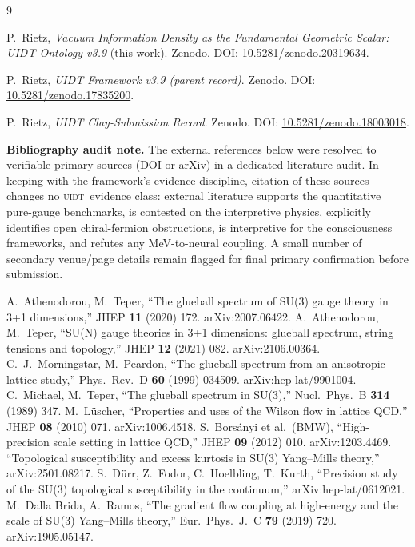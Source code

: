 \documentclass[12pt,a4paper,twoside]{article}
\theoremstyle{plain}
\theoremstyle{definition}
\theoremstyle{remark}
\newcommand{\UIDT}{\textsc{uidt}}
\begin{document}
\newpage
\begin{thebibliography}{9}
\footnotesize

P.~Rietz, \textit{Vacuum Information Density as the Fundamental Geometric Scalar: UIDT Ontology v3.9} (this work). Zenodo. DOI: \href{https://doi.org/10.5281/zenodo.20319634}{10.5281/zenodo.20319634}.

P.~Rietz, \textit{UIDT Framework v3.9 (parent record)}. Zenodo. DOI: \href{https://doi.org/10.5281/zenodo.17835200}{10.5281/zenodo.17835200}.

P.~Rietz, \textit{UIDT Clay-Submission Record}. Zenodo. DOI: \href{https://doi.org/10.5281/zenodo.18003018}{10.5281/zenodo.18003018}.

\textbf{Bibliography audit note.} The external references below were resolved to verifiable primary sources (DOI or arXiv) in a dedicated literature audit. In keeping with the framework's evidence discipline, citation of these sources changes no \UIDT\ evidence class: external literature supports the quantitative pure-gauge benchmarks, is contested on the interpretive physics, explicitly identifies open chiral-fermion obstructions, is interpretive for the consciousness frameworks, and refutes any MeV-to-neural coupling. A small number of secondary venue/page details remain flagged for final primary confirmation before submission.

A.~Athenodorou, M.~Teper, ``The glueball spectrum of SU(3) gauge theory in 3+1 dimensions,'' JHEP \textbf{11} (2020) 172. arXiv:2007.06422.
A.~Athenodorou, M.~Teper, ``SU(N) gauge theories in 3+1 dimensions: glueball spectrum, string tensions and topology,'' JHEP \textbf{12} (2021) 082. arXiv:2106.00364.
C.~J.~Morningstar, M.~Peardon, ``The glueball spectrum from an anisotropic lattice study,'' Phys.\ Rev.\ D \textbf{60} (1999) 034509. arXiv:hep-lat/9901004.
C.~Michael, M.~Teper, ``The glueball spectrum in SU(3),'' Nucl.\ Phys.\ B \textbf{314} (1989) 347.
M.~L\"uscher, ``Properties and uses of the Wilson flow in lattice QCD,'' JHEP \textbf{08} (2010) 071. arXiv:1006.4518.
S.~Bors\'anyi et al.\ (BMW), ``High-precision scale setting in lattice QCD,'' JHEP \textbf{09} (2012) 010. arXiv:1203.4469.
``Topological susceptibility and excess kurtosis in SU(3) Yang--Mills theory,'' arXiv:2501.08217.
S.~D\"urr, Z.~Fodor, C.~Hoelbling, T.~Kurth, ``Precision study of the SU(3) topological susceptibility in the continuum,'' arXiv:hep-lat/0612021.
M.~Dalla Brida, A.~Ramos, ``The gradient flow coupling at high-energy and the scale of SU(3) Yang--Mills theory,'' Eur.\ Phys.\ J.\ C \textbf{79} (2019) 720. arXiv:1905.05147.


\end{thebibliography}
\end{document}
